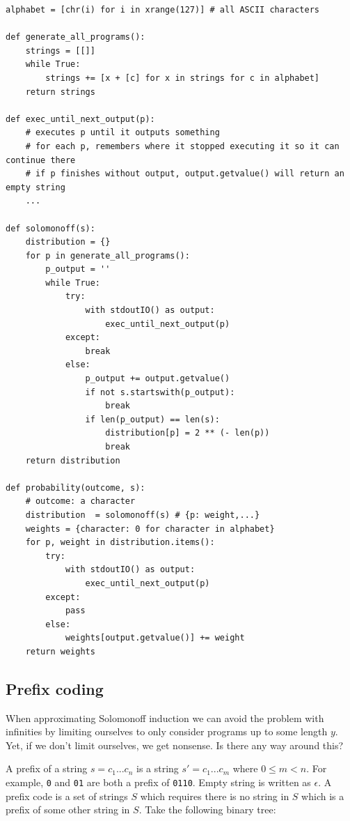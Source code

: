 \newpage

\begin{lstlisting}[caption={A naive Solomonoff induction implementation, which runs into a problem with infinite sums.}]
alphabet = [chr(i) for i in xrange(127)] # all ASCII characters

def generate_all_programs():
	strings = [[]]
	while True:
		strings += [x + [c] for x in strings for c in alphabet]
	return strings

def exec_until_next_output(p):
	# executes p until it outputs something
	# for each p, remembers where it stopped executing it so it can continue there
	# if p finishes without output, output.getvalue() will return an empty string
	...

def solomonoff(s):
	distribution = {}
	for p in generate_all_programs():
		p_output = ''
		while True:
			try:
				with stdoutIO() as output:
					exec_until_next_output(p)
			except:
				break
			else:
				p_output += output.getvalue()
				if not s.startswith(p_output):
					break
				if len(p_output) == len(s):
					distribution[p] = 2 ** (- len(p))
					break
	return distribution

def probability(outcome, s):
	# outcome: a character
	distribution  = solomonoff(s) # {p: weight,...}
	weights = {character: 0 for character in alphabet}
	for p, weight in distribution.items():
		try:
			with stdoutIO() as output:
				exec_until_next_output(p)
		except:
			pass
		else:
			weights[output.getvalue()] += weight
	return weights
\end{lstlisting}

\newpage

\subsection{Prefix coding} 

When approximating Solomonoff induction we can avoid the problem with infinities by limiting ourselves to only consider programs up to some length $y$.
Yet, if we don't limit ourselves, we get nonsense.
Is there any way around this?

A prefix of a string $s = c_1...c_n$ is a string $s' = c_1...c_m$ where $0 \leq m < n$.
For example, \texttt{0} and \texttt{01} are both a prefix of \texttt{0110}.
Empty string is written as $\epsilon$.
A prefix code is a set of strings $S$ which requires there is no string in $S$ which is a prefix of some other string in $S$.
Take the following binary tree:

\begin{figure}[h]
	\centering
{}
\end{figure}

